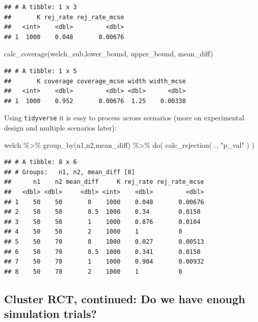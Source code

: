 \documentclass[
]{book}
\newenvironment{Shaded}{\begin{snugshade}}{\end{snugshade}}
\newcommand{\FunctionTok}[1]{\textcolor[rgb]{0.00,0.00,0.00}{#1}}
\newcommand{\NormalTok}[1]{#1}
\newcommand{\SpecialCharTok}[1]{\textcolor[rgb]{0.00,0.00,0.00}{#1}}
\newcommand{\StringTok}[1]{\textcolor[rgb]{0.31,0.60,0.02}{#1}}
\begin{document}
\begin{verbatim}
## # A tibble: 1 x 3
##       K rej_rate rej_rate_mcse
##   <int>    <dbl>         <dbl>
## 1  1000    0.048       0.00676
\end{verbatim}

\begin{Shaded}
\begin{Highlighting}[]
\FunctionTok{calc\_coverage}\NormalTok{(welch\_sub,lower\_bound, upper\_bound, mean\_diff)}
\end{Highlighting}
\end{Shaded}

\begin{verbatim}
## # A tibble: 1 x 5
##       K coverage coverage_mcse width width_mcse
##   <int>    <dbl>         <dbl> <dbl>      <dbl>
## 1  1000    0.952       0.00676  1.25    0.00338
\end{verbatim}

Using \texttt{tidyverse} it is easy to process across scenarios (more on experimental design and multiple scenarios later):

\begin{Shaded}
\begin{Highlighting}[]
\NormalTok{welch }\SpecialCharTok{\%\textgreater{}\%} \FunctionTok{group\_by}\NormalTok{(n1,n2,mean\_diff) }\SpecialCharTok{\%\textgreater{}\%}
  \FunctionTok{do}\NormalTok{( }\FunctionTok{calc\_rejection}\NormalTok{( ., }\StringTok{"p\_val"}\NormalTok{ ) )}
\end{Highlighting}
\end{Shaded}

\begin{verbatim}
## # A tibble: 8 x 6
## # Groups:   n1, n2, mean_diff [8]
##      n1    n2 mean_diff     K rej_rate rej_rate_mcse
##   <dbl> <dbl>     <dbl> <int>    <dbl>         <dbl>
## 1    50    50       0    1000    0.048       0.00676
## 2    50    50       0.5  1000    0.34        0.0150 
## 3    50    50       1    1000    0.876       0.0104 
## 4    50    50       2    1000    1           0      
## 5    50    70       0    1000    0.027       0.00513
## 6    50    70       0.5  1000    0.341       0.0150 
## 7    50    70       1    1000    0.904       0.00932
## 8    50    70       2    1000    1           0
\end{verbatim}

\hypertarget{cluster-rct-continued-do-we-have-enough-simulation-trials}{%
\subsection{Cluster RCT, continued: Do we have enough simulation trials?}\label{cluster-rct-continued-do-we-have-enough-simulation-trials}}
\end{document}
